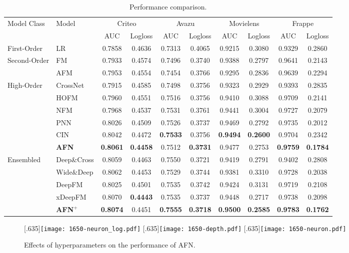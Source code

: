 \documentclass[letterpaper]{article} \usepackage{aaai20}  \usepackage{times}  \usepackage{helvet} \usepackage{courier}  \usepackage[hyphens]{url}  \usepackage{graphicx} \urlstyle{rm} \def\UrlFont{\rm}  \usepackage{graphicx}  \frenchspacing  \setlength{\pdfpagewidth}{8.5in}  \setlength{\pdfpageheight}{11in}
\newcommand{\modelns}{{AFN}}
\begin{document}
\begin{table*}[t!]
\small
	\captionsetup{labelfont=bf}
	\centering
		\caption{Performance comparison.}
		\label{tab:performance}
	\begin{tabular}{llcccccccc}
		\toprule[1pt]
\multirow{2}{*}{Model Class}&
\multirow{2}{*}{Model}
		 &\multicolumn{2}{c}{Criteo}&\multicolumn{2}{c}{Avazu}&\multicolumn{2}{c}{Movielens}&\multicolumn{2}{c}{Frappe}\\
		 &&AUC&Logloss&AUC&Logloss&AUC&Logloss&AUC&Logloss\\
		\midrule[0.5pt] 
		 First-Order&LR&0.7858&0.4636&0.7313&0.4065&0.9215&0.3080&0.9329&0.2860\\
		\midrule[0.5pt] 
		\multirow{2}{*}{Second-Order 
}&
FM& 0.7933&0.4574&0.7496&0.3740&0.9388&0.2797&0.9641&0.2143\\ 
&AFM&0.7953&0.4554&0.7454&0.3766&0.9295&0.2836&0.9639&0.2294\\ 
\midrule[0.5pt]
\multirow{6}{*}{High-Order 
}&
CrossNet&0.7915&0.4585&0.7498&0.3756&0.9323&0.2929&0.9393&0.2835\\ 
&HOFM&0.7960&0.4551&0.7516&0.3756&0.9410&0.3088&0.9709&0.2141\\
&NFM&0.7968&0.4537&0.7531&0.3761& 0.9441&0.3004&0.9727&0.2079\\
&PNN&0.8026&0.4509&0.7526&0.3737&0.9469&0.2792&0.9735&0.2012\\
&CIN&0.8042&0.4472&\bf{0.7533}&0.3756&\bf{0.9494}&\bf{0.2600}&0.9704&0.2342\\ 
&\bf{AFN}&\bf{0.8061}&\bf{0.4458}&0.7512&\bf{0.3731}&0.9477&0.2753&\bf{0.9759}&\bf{0.1784}\\
\midrule[0.5pt]
\multirow{6}{*}{Ensembled 
}&
Deep\&Cross&0.8059&0.4463&0.7550&0.3721&0.9419&0.2791&0.9402&0.2808\\
		&Wide\&Deep&0.8062&0.4453&0.7529&0.3744&0.9381&0.3310&0.9728&0.2038\\
		&DeepFM&0.8025&0.4501&0.7535&0.3742&0.9424&0.3131&0.9719&0.2108\\
		&xDeepFM&0.8070&\bf{0.4443}&0.7535&0.3737&0.9448&0.2717&0.9738&0.2098\\ 
		&\bf{AFN$^+$}&\bf{0.8074}&0.4451&\bf{0.7555}&\bf{0.3718}&\bf{0.9500}&\bf{0.2585}&\bf{0.9783}&\bf{0.1762}\\
		\bottomrule[1pt]
	\end{tabular}  
\end{table*}

\begin{figure*}
	\centering
	[.635\columnwidth]{\texttt{[image: 1650-neuron\_log.pdf]}}
	[.635\columnwidth]{\texttt{[image: 1650-depth.pdf]}}
	[.635\columnwidth]{\texttt{[image: 1650-neuron.pdf]}}
	\caption{Effects of hyperparameters on the performance of \modelns.}\label{fig:hyper}
\end{figure*}
\end{document}
